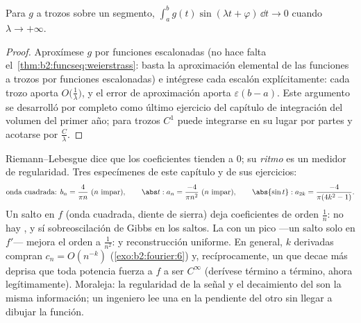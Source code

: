 \begin{theorem}\label{thm:b2:fourier:riemannlebesgue}
Para $g$  a trozos sobre un segmento, $\int_a^b
g(t)\sin(\lambda t + \varphi)\,\dd t \to 0$ cuando $\lambda \to
+\infty$.
\end{theorem}

\begin{proof}
Aproxímese $g$  por funciones escalonadas (no hace falta
el~\cref{thm:b2:funcseq:weierstrass}: basta la aproximación
elemental de las funciones  a trozos por funciones
escalonadas) e intégrese cada escalón explícitamente: cada trozo
aporta $O\bigl(\frac1\lambda\bigr)$, y el error de aproximación
aporta $\varepsilon(b - a)$. Este argumento se desarrolló por
completo como último ejercicio del capítulo de integración del
volumen del primer año; para trozos $C^1$ puede integrarse en su
lugar por partes y acotarse por $\frac C\lambda$.
\end{proof}

\begin{example}\label{ex:b2:fourier:decaytable}
Riemann--Lebesgue dice que los coeficientes tienden a $0$; su
\emph{ritmo} es un medidor de regularidad. Tres especímenes de este
capítulo y de sus ejercicios:
\[
\text{onda cuadrada: } b_n = \frac{4}{\pi n}\ (n\ \text{impar}),
\qquad
\abs t : a_n = \frac{-4}{\pi n^2}\ (n\ \text{impar}),
\qquad
\abs{\sin t} : a_{2k} = \frac{-4}{\pi(4k^2-1)} .
\]
Un salto en $f$ (onda cuadrada, diente de sierra) deja coeficientes
de orden $\frac1n$: no hay , y sí sobreoscilación
de Gibbs en los saltos. La  con un pico ---un salto solo
en $f'$--- mejora el orden a $\frac{1}{n^2}$:  y
reconstrucción uniforme. En general, $k$ derivadas compran $c_n =
O(n^{-k})$ (\cref{exo:b2:fourier:6}) y, recíprocamente, un
 que decae más deprisa que toda potencia fuerza a $f$ a ser
$C^\infty$ (derívese término a término, ahora legítimamente).
Moraleja: la regularidad de la señal y el decaimiento del
 son la misma información; un ingeniero lee una en la
pendiente del otro sin llegar a dibujar la función.
\end{example}

